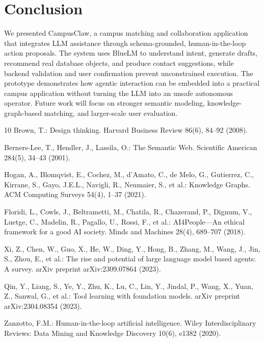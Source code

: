 \documentclass[twocolumn]{article}
\begin{document}
\section{Conclusion}
We presented CampusClaw, a campus matching and collaboration application that integrates LLM assistance through schema-grounded, human-in-the-loop action proposals. The system uses BlueLM to understand intent, generate drafts, recommend real database objects, and produce contact suggestions, while backend validation and user confirmation prevent unconstrained execution. The prototype demonstrates how agentic interaction can be embedded into a practical campus application without turning the LLM into an unsafe autonomous operator. Future work will focus on stronger semantic modeling, knowledge-graph-based matching, and larger-scale user evaluation.

\begin{thebibliography}{10}
Brown, T.: Design thinking. Harvard Business Review 86(6), 84--92 (2008).

Berners-Lee, T., Hendler, J., Lassila, O.: The Semantic Web. Scientific American 284(5), 34--43 (2001).

Hogan, A., Blomqvist, E., Cochez, M., d'Amato, C., de Melo, G., Gutierrez, C., Kirrane, S., Gayo, J.E.L., Navigli, R., Neumaier, S., et al.: Knowledge Graphs. ACM Computing Surveys 54(4), 1--37 (2021).

Floridi, L., Cowls, J., Beltrametti, M., Chatila, R., Chazerand, P., Dignum, V., Luetge, C., Madelin, R., Pagallo, U., Rossi, F., et al.: AI4People---An ethical framework for a good AI society. Minds and Machines 28(4), 689--707 (2018).

Xi, Z., Chen, W., Guo, X., He, W., Ding, Y., Hong, B., Zhang, M., Wang, J., Jin, S., Zhou, E., et al.: The rise and potential of large language model based agents: A survey. arXiv preprint arXiv:2309.07864 (2023).

Qin, Y., Liang, S., Ye, Y., Zhu, K., Lu, C., Lin, Y., Jindal, P., Wang, X., Yuan, Z., Sanwal, G., et al.: Tool learning with foundation models. arXiv preprint arXiv:2304.08354 (2023).

Zanzotto, F.M.: Human-in-the-loop artificial intelligence. Wiley Interdisciplinary Reviews: Data Mining and Knowledge Discovery 10(6), e1382 (2020).
\end{thebibliography}
\end{document}
